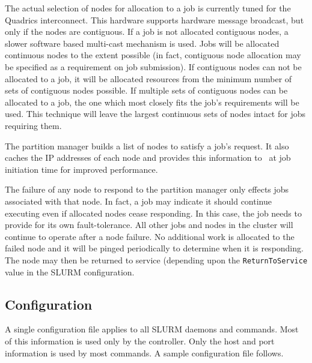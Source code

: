 The actual selection of nodes for allocation to a job is currently
tuned for the Quadrics interconnect.  This hardware supports hardware
message broadcast, but only if the nodes are contiguous.  If a job
is not allocated contiguous nodes, a slower software based multi-cast
mechanism is used.  Jobs will be allocated continuous nodes to the
extent possible (in fact, contiguous node allocation may be specified 
as a requirement on job submission). 
If contiguous nodes
can not be allocated to a job, it will be allocated resources from
the minimum number of sets of contiguous nodes possible.  If multiple
sets of contiguous nodes can be allocated to a job, the one which most
closely fits the job's requirements will be used.  This technique will
leave the largest continuous sets of nodes intact for jobs requiring them.

The partition manager builds a list of nodes to satisfy a job's
request.  It also caches the IP addresses of
each node and provides this information to \srun\ at job initiation
time for improved performance.

The failure of any node to respond to the partition manager only
effects jobs associated with that node.  
In fact, a job may indicate it should continue executing even if 
allocated nodes cease responding.
In this case, the job needs to provide for its own fault-tolerance.
All other jobs and nodes in the cluster will continue to operate after
a node failure.  No additional work is allocated to the failed
node and it will be pinged periodically to determine when it is 
responding. The node may then be returned to service (depending 
upon the {\tt ReturnToService} value in the SLURM configuration. 

\subsection{Configuration}

A single configuration file applies to all SLURM daemons and commands.
Most of this information is used only by the controller. 
Only the host and port information is used by most commands.
A sample configuration file follows.

